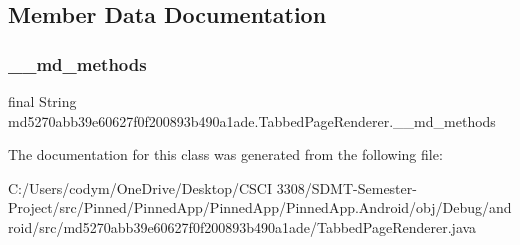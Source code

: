 \subsection{Member Data Documentation}
\mbox{\label{classmd5270abb39e60627f0f200893b490a1ade_1_1_tabbed_page_renderer_a61bf05aab3c9447ee5d368ab4be86a41}} 
\subsubsection{\texorpdfstring{\+\_\+\+\_\+md\+\_\+methods}{\_\_md\_methods}}
{\footnotesize\ttfamily final String md5270abb39e60627f0f200893b490a1ade.\+Tabbed\+Page\+Renderer.\+\_\+\+\_\+md\+\_\+methods\hspace{0.3cm}{\ttfamily [static]}}



The documentation for this class was generated from the following file\+:\begin{DoxyCompactItemize}
\item 
C\+:/\+Users/codym/\+One\+Drive/\+Desktop/\+C\+S\+C\+I 3308/\+S\+D\+M\+T-\/\+Semester-\/\+Project/src/\+Pinned/\+Pinned\+App/\+Pinned\+App/\+Pinned\+App.\+Android/obj/\+Debug/android/src/md5270abb39e60627f0f200893b490a1ade/Tabbed\+Page\+Renderer.\+java\end{DoxyCompactItemize}
